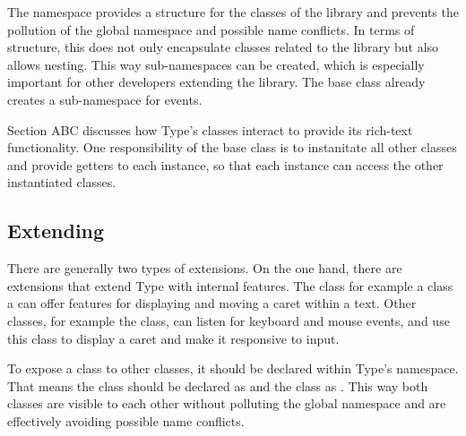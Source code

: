The namespace provides a structure for the classes of the library and prevents the pollution of the global namespace and possible name conflicts. In terms of structure, this does not only encapsulate classes related to the library but also allows nesting. This way sub-namespaces can be created, which is especially important for other developers extending the library. The  base class already creates a sub-namespace  for events.

Section ABC discusses how Type's classes interact to provide its rich-text functionality. One responsibility of the  base class is to instanitate all other classes and provide getters to each instance, so that each instance can access the other instantiated classes.





\subsection{Extending}

There are generally two types of extensions. On the one hand, there are extensions that extend Type with internal features. The  class for example a class a can offer features for displaying and moving a caret within a text. Other classes, for example the  class, can listen for keyboard and mouse events, and use this class to display a caret and make it responsive to input.

To expose a class to other classes, it should be declared within Type's namespace. That means the  class should be declared as  and the  class as . This way both classes are visible to each other without polluting the global namespace and are effectively avoiding possible name conflicts.


